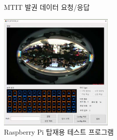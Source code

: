 \begin{figure}[!ht]
\begin{fullwidth}
{			\caption*{MTIT 발권 데이터 요청/응답}
		}\qquad
		\parbox{0.5\textwidth}{
			\centering
			\includegraphics[width=0.5\textwidth]{images/korail_seat_02.jpg}
			\caption*{Raspberry Pi 탑재용 테스트 프로그램}
		}
	\end{fullwidth}
\end{figure}

\divider



